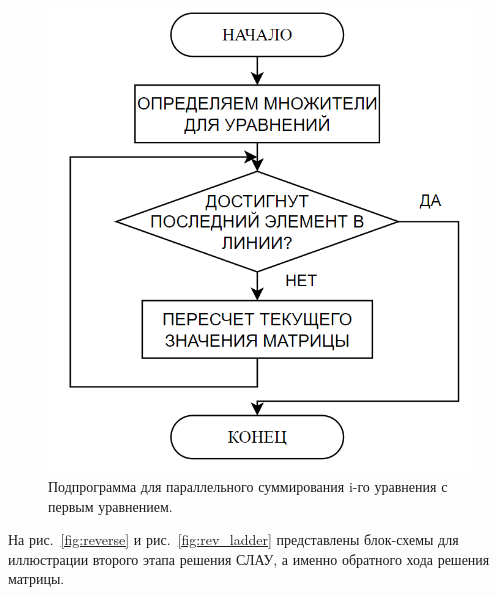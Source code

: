 \documentclass{altsu-bachelor}
\begin{document}
\begin{figure}[H]
    \centering
    \includegraphics[scale=0.5]{ladder.png}
    \caption{Подпрограмма для параллельного суммирования i-го уравнения с первым уравнением.}
    \label{fig:ladder}
\end{figure}

На рис.~\ref{fig:reverse} и рис.~\ref{fig:rev_ladder} представлены блок-схемы для иллюстрации второго этапа решения СЛАУ, а именно обратного хода решения матрицы.
\end{document}
